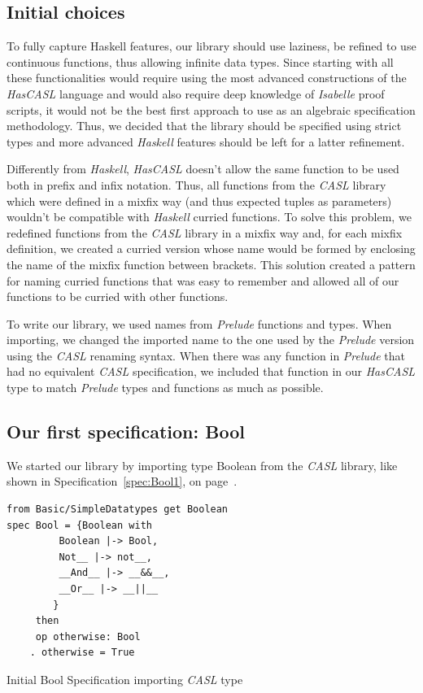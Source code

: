 \documentclass[12pt,twoside]{article}
\numberwithin{spec}{subsection}
\numberwithin{proof}{subsection}
\numberwithin{figure}{subsection}
\numberwithin{code}{subsection}
\newcommand{\citeSpec}[1]{Specification~\ref{#1}, on page~\pageref{#1}}
\begin{document}
\subsection{Initial choices}
To fully capture Haskell features, our library should use laziness, be refined to use continuous functions, thus allowing infinite data types. Since starting with all these functionalities would require using the most advanced constructions of the \textit{HasCASL} language and would also require deep knowledge of \textit{Isabelle} proof scripts, it would not be the best first approach to use as an algebraic specification methodology. Thus, we decided that the library should be specified using strict types and more advanced \textit{Haskell} features should be left for a latter refinement.

Differently from \textit{Haskell}, \textit{HasCASL} doesn't allow the same function to be used both in prefix and infix notation. Thus, all functions from the \textit{CASL} library which were defined in a mixfix way (and thus expected tuples as parameters) wouldn't be compatible with \textit{Haskell} curried functions. To solve this problem, we redefined functions from the \textit{CASL} library in a mixfix way and, for each mixfix definition, we created a curried version whose name would be formed by enclosing the name of the mixfix function between brackets. This solution created a pattern for naming curried functions that was easy to remember and allowed all of our functions to be curried with other functions.

To write our library, we used names from \textit{Prelude} functions and types. When importing, we changed the imported name to the one used by the \textit{Prelude} version using the \textit{CASL} renaming syntax. When there was any function in \textit{Prelude} that had no equivalent \textit{CASL} specification, we included that function in our \textit{HasCASL} type to match \textit{Prelude} types and functions as much as possible.

\subsection{Our first specification: Bool}
We started our library by importing type Boolean from the \textit{CASL} library, like shown in \citeSpec{spec:Bool1}.

\begin{spec}
\footnotesize
\begin{verbatim}
from Basic/SimpleDatatypes get Boolean
spec Bool = {Boolean with 
         Boolean |-> Bool,
         Not__ |-> not__,
         __And__ |-> __&&__,
         __Or__ |-> __||__
        }
     then
     op otherwise: Bool
    . otherwise = True
\end{verbatim}
\caption{Initial Bool Specification importing \textit{CASL} type}
\label{spec:Bool1}
\end{spec}
\end{document}
